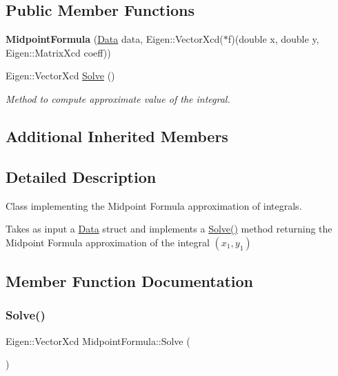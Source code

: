 \subsection*{Public Member Functions}
\begin{DoxyCompactItemize}
\item 
\mbox{\label{class_midpoint_formula_ad3c444776b53996d50dbf88a61c36c8c}} 
{\bfseries Midpoint\+Formula} (\hyperlink{struct_data}{Data} data, Eigen\+::\+Vector\+Xcd($\ast$f)(double x, double y, Eigen\+::\+Matrix\+Xcd coeff))
\item 
Eigen\+::\+Vector\+Xcd \hyperlink{class_midpoint_formula_add437323dfb0bc181b0051c5aaf80ba7}{Solve} ()
\begin{DoxyCompactList}\small\item\em Method to compute approximate value of the integral. \end{DoxyCompactList}\end{DoxyCompactItemize}
\subsection*{Additional Inherited Members}


\subsection{Detailed Description}
Class implementing the Midpoint Formula approximation of integrals. 

Takes as input a \hyperlink{struct_data}{Data} struct and implements a \hyperlink{class_midpoint_formula_add437323dfb0bc181b0051c5aaf80ba7}{Solve()} method returning the Midpoint Formula approximation of the integral $(x_1,y_1)$ 

\subsection{Member Function Documentation}
\mbox{\label{class_midpoint_formula_add437323dfb0bc181b0051c5aaf80ba7}} 
\subsubsection{\texorpdfstring{Solve()}{Solve()}}
{\footnotesize\ttfamily Eigen\+::\+Vector\+Xcd Midpoint\+Formula\+::\+Solve (\begin{DoxyParamCaption}{ }\end{DoxyParamCaption})\hspace{0.3cm}{\ttfamily [virtual]}}



